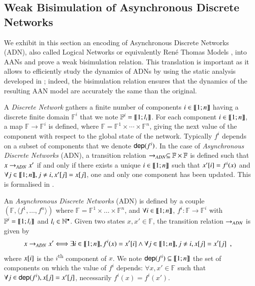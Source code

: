 \subsection{Weak Bisimulation of Asynchronous Discrete Networks}
\label{sec:dn}

We exhibit in this section an encoding of Asynchronous Discrete Networks (ADN),
also called Logical Networks or equivalently René Thomas Models \cite{Thomas95,deJong02},
into AANs and prove a weak bisimulation relation.
This translation is important as it allows to efficiently study the dynamics of ADNs
by using the static analysis developed in ;
indeed, the bisimulation relation ensures that the dynamics of the
resulting AAN model are accurately the same than the original.

A \emph{Discrete Network} gathers a finite number of components $i\in\llbracket 1; n \rrbracket$ having a discrete finite domain
$\mathbb F^i$ that we note $\mathbb{F}^i = \llbracket 1; l_i \rrbracket$.
For each component $i\in\llbracket 1; n \rrbracket$, a map $\mathbb F \rightarrow \mathbb F^i$ is defined, where
$\mathbb F = \mathbb F^1 \times \cdots \times \mathbb F^n$, giving the next value of the component
with respect to the global state of the network.
Typically $f^i$ depends on a subset of components that we denote $\mathsf{dep}(f^i)$.
In the case of \emph{Asynchronous Discrete Networks} (ADN), a transition relation $\rightarrow_{ADN}\subseteq \mathbb
F\times \mathbb F$ is defined such that $x\rightarrow_{ADN} x'$ if and only if there exists a unique
$i\in\llbracket 1; n \rrbracket$ such that $x'[{i}]=f^i(x)$ and $\forall j\in\llbracket 1; n \rrbracket, j\neq i, x'[{j}]
=x[{j}]$, \ie one and only one component has been updated.
This is formalised in .

\begin{definition}
\label{def:DN}
  An \emph{Asynchronous Discrete Networks} (ADN) is defined by a couple $(\mathbb F, \langle f^1, \dots, f^n \rangle)$
  where $\mathbb{F} = \mathbb{F}^1\times\dots\times\mathbb{F}^n$,
  and $\forall i\in\llbracket 1; n \rrbracket$,
  $f^i: \mathbb{F} \rightarrow \mathbb{F}^i$ with
  $\mathbb{F}^i = \llbracket 1; l_i \rrbracket$ and $l_i \in \mathbb{N}^\bullet$.
  Given two states $x,x'\in\mathbb F$, the transition relation $\rightarrow_{ADN}$ is given by
  \[
  x\rightarrow_{ADN} x' \Longleftrightarrow
    \exists i\in\llbracket 1; n \rrbracket, f^i(x)=x'[{i}]
    \wedge \forall j\in\llbracket 1; n \rrbracket, j\neq i, x[{j}]=x'[{j}]
  \enspace,
  \]
  where $x[{i}]$ is the $i$\textsuperscript{th} component of $x$.
  We note $\mathsf{dep}(f^i)\subseteq \llbracket 1; n \rrbracket$ the set of components on which the value of $f^i$
  depends: $\forall x,x'\in \mathbb F$ such that $\forall
  j\in\mathsf{dep}(f^i), x[{j}]=x'[{j}]$, necessarily $f^i(x)=f^i(x')$.
\end{definition}

